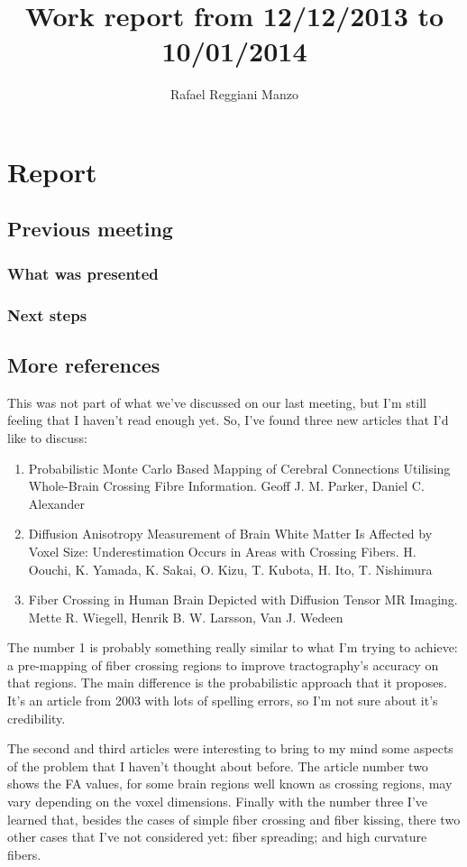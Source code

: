 \documentclass[a4paper,11pt]{report}
\title{Work report from 12/12/2013 to 10/01/2014}
\author{Rafael Reggiani Manzo}
\begin{document}
\maketitle
\tableofcontents

\begin{abstract}
\end{abstract}

\chapter{Report}
\section{Previous meeting}
  \subsection{What was presented}

  \subsection{Next steps}

\section{More references}
This was not part of what we've discussed on our last meeting, but I'm still feeling that I haven't read enough yet. So, I've found three new articles that I'd like to discuss:

\begin{enumerate}
  \item Probabilistic Monte Carlo Based Mapping of Cerebral Connections Utilising Whole-Brain Crossing Fibre Information. Geoff J. M. Parker, Daniel C. Alexander
  \item Diffusion Anisotropy Measurement of Brain White Matter Is Affected by Voxel Size: Underestimation Occurs in Areas with Crossing Fibers. H. Oouchi, K. Yamada, K. Sakai, O. Kizu, T. Kubota, H. Ito, T. Nishimura
  \item Fiber Crossing in Human Brain Depicted with Diffusion Tensor MR Imaging. Mette R. Wiegell, Henrik B. W. Larsson, Van J. Wedeen
\end{enumerate}

The number 1 is probably something really similar to what I'm trying to achieve: a pre-mapping of fiber crossing regions to improve tractography's accuracy on that regions. The main difference is the probabilistic approach that it proposes. It's an article from 2003 with lots of spelling errors, so I'm not sure about it's credibility.

The second and third articles were interesting to bring to my mind some aspects of the problem that I haven't thought about before. The article number two shows the FA values, for some brain regions well known as crossing regions, may vary depending on the voxel dimensions. Finally with the number three I've learned that, besides the cases of simple fiber crossing and fiber kissing, there two other cases that I've not considered yet: fiber spreading; and high curvature fibers.
\end{document}
